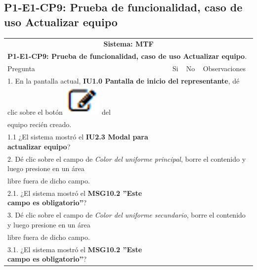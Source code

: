 \documentclass[oneside,10pt]{book}
\begin{document}
\newpage

\subsection{P1-E1-CP9: Prueba de funcionalidad, caso de uso Actualizar equipo}

\begin{tabularx}{\textwidth}{ X l l X }
\multicolumn{4}{c}{\cellcolor[HTML]{9B9B9B}\textbf{Sistema: MTF}}                                                                                     \\
\multicolumn{4}{l}{\cellcolor[HTML]{EFEFEF}\textbf{P1-E1-CP9: Prueba de funcionalidad, caso de uso Actualizar equipo}.}                                                   \\ \hline
\multicolumn{1}{|X|}{Pregunta}                               & \multicolumn{1}{l|}{Si} & \multicolumn{1}{l|}{No} & \multicolumn{1}{X|}{Observaciones} \\ \hline

\multicolumn{4}{|l|}{1. En la pantalla actual, \textbf{IU1.0 Pantalla de inicio del representante}, dé clic sobre el botón \includegraphics[scale=.3]{images/edit} del}              \\
\multicolumn{4}{|l|}{equipo recién creado.} \\ \hline
\multicolumn{1}{|X|}{1.1 ¿El sistema mostró el \textbf{IU2.3 Modal para actualizar equipo}?} & \multicolumn{1}{l|}{}   & \multicolumn{1}{l|}{}   & \multicolumn{1}{X|}{}              \\ \hline

\multicolumn{4}{|l|}{2. Dé clic sobre el campo de \textit{Color del uniforme principal}, borre el contenido y luego presione en un área}              \\
\multicolumn{4}{|l|}{libre fuera de dicho campo.}              \\ \hline
\multicolumn{1}{|X|}{2.1. ¿El sistema mostró el \textbf{MSG10.2 ''Este campo es obligatorio''}?} & \multicolumn{1}{l|}{}   & \multicolumn{1}{l|}{}   & \multicolumn{1}{X|}{}              \\ \hline

\multicolumn{4}{|l|}{3. Dé clic sobre el campo de \textit{Color del uniforme secundario}, borre el contenido y luego presione en un área}              \\
\multicolumn{4}{|l|}{libre fuera de dicho campo.}              \\ \hline
\multicolumn{1}{|X|}{3.1. ¿El sistema mostró el \textbf{MSG10.2 ''Este campo es obligatorio''}?} & \multicolumn{1}{l|}{}   & \multicolumn{1}{l|}{}   & \multicolumn{1}{X|}{}              \\ \hline


\end{tabularx}
\end{document}
